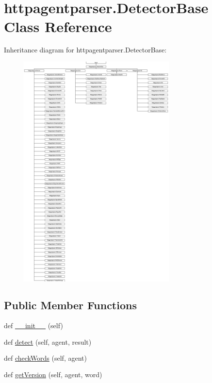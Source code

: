 \hypertarget{classhttpagentparser_1_1_detector_base}{}\section{httpagentparser.\+Detector\+Base Class Reference}
\label{classhttpagentparser_1_1_detector_base}
Inheritance diagram for httpagentparser.\+Detector\+Base\+:\begin{figure}[H]
\begin{center}
\leavevmode
\includegraphics[height=12.000000cm]{classhttpagentparser_1_1_detector_base}
\end{center}
\end{figure}
\subsection*{Public Member Functions}
\begin{DoxyCompactItemize}
\item 
def \hyperlink{classhttpagentparser_1_1_detector_base_aa88a09548fa28a9ff529bb5a844d992a}{\+\_\+\+\_\+init\+\_\+\+\_\+} (self)
\item 
def \hyperlink{classhttpagentparser_1_1_detector_base_ab36e580d28b952b6a56b2eddeea5d845}{detect} (self, agent, result)
\item 
def \hyperlink{classhttpagentparser_1_1_detector_base_a77173ed8507f7d27538e7ccaced1473f}{check\+Words} (self, agent)
\item 
def \hyperlink{classhttpagentparser_1_1_detector_base_a06cd51717213a696fd3c096de2a0ed3c}{get\+Version} (self, agent, word)
\end{DoxyCompactItemize}
